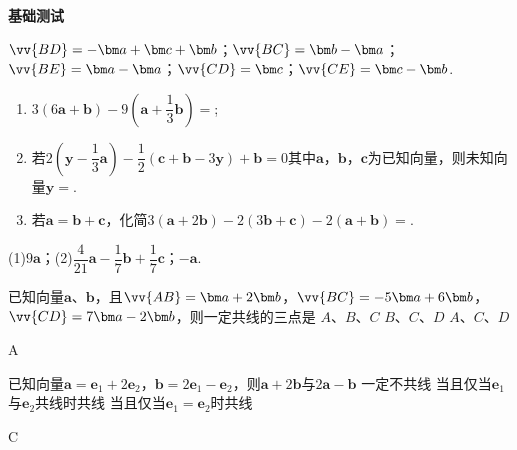 \begin{exercise}{\textbf{基础测试}}
\begin{flushright}
\begin{tikzpicture}
        \end{tikzpicture}
      \end{flushright}
      \begin{answer}
        $\vv{BD}=-\bm a+\bm c+\bm b$；$\vv{BC}=\bm b-\bm a$；$\vv{BE}=\bm a-\bm a$；$\vv{CD}=\bm c$；$\vv{CE}=\bm c-\bm b$.
      \end{answer}
    \item
      \begin{enumerate}[label=\arabic*)]
        \item $3(6\bm{a}+\bm{b})-9(\bm{a}+\dfrac13\bm{b})=$\tk;
        \item 若$2(\bm{y}-\dfrac13\bm{a})-\dfrac12(\bm c+\bm b-3\bm y)+\bm b=0$其中$\bm a$，$\bm b$，$\bm c$为已知向量，则未知向量$\bm y=$\tk.
        \item 若$\bm a=\bm b+\bm c$，化简$3(\bm a+2\bm b)-2(3\bm b+\bm c)-2(\bm a+\bm b)=$\tk.
      \end{enumerate}
      \begin{answer}
        (1)$9\bm a$；(2)$\dfrac4{21}\bm a-\dfrac17\bm b+\dfrac17\bm c$；$-\bm a$.
      \end{answer}
    \item%
      已知向量$\bm a$、$\bm b$，且$\vv{AB}=\bm a+2\bm b$，$\vv{BC}=-5\bm a+6\bm b$，$\vv{CD}=7\bm a-2\bm b$，则一定共线的三点是\xz
        {$A$、$B$、$C$}
        {$B$、$C$、$D$}
        {$A$、$C$、$D$}
      \begin{answer}
        A
      \end{answer}
    \item%
      已知向量$\bm a=\bm e_1+2\bm e_2$，$\bm b=2\bm e_1-\bm e_2$，则$\bm a+2\bm b$与$2\bm a-\bm b$\xz
        {一定不共线}
        {当且仅当$\bm e_1$与$\bm e_2$共线时共线}
        {当且仅当$\bm e_1=\bm e_2$时共线}
      \begin{answer}
        C
      \end{answer}
  \end{exercise}
\newpage
